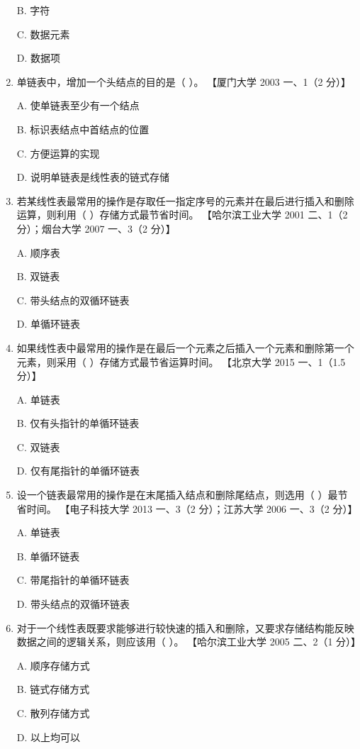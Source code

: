\documentclass[lang=cn,newtx,10pt,scheme=chinese]{elegantbook}
\begin{document}
\begin{enumerate}
    B. 字符  

    C. 数据元素  

    D. 数据项  

    \item 单链表中，增加一个头结点的目的是（ ）。  
    【厦门大学 2003 一、1（2 分）】  

    A. 使单链表至少有一个结点  

    B. 标识表结点中首结点的位置  

    C. 方便运算的实现  

    D. 说明单链表是线性表的链式存储  

    \item 若某线性表最常用的操作是存取任一指定序号的元素并在最后进行插入和删除运算，则利用（ ）存储方式最节省时间。  
    【哈尔滨工业大学 2001 二、1（2 分）；烟台大学 2007 一、3（2 分）】  

    A. 顺序表  

    B. 双链表  

    C. 带头结点的双循环链表  

    D. 单循环链表  

    \item 如果线性表中最常用的操作是在最后一个元素之后插入一个元素和删除第一个元素，则采用（ ）存储方式最节省运算时间。  
    【北京大学 2015 一、1（1.5 分）】  

    A. 单链表  

    B. 仅有头指针的单循环链表  

    C. 双链表  

    D. 仅有尾指针的单循环链表  

    \item 设一个链表最常用的操作是在末尾插入结点和删除尾结点，则选用（ ）最节省时间。  
    【电子科技大学 2013 一、3（2 分）；江苏大学 2006 一、3（2 分）】  

    A. 单链表  

    B. 单循环链表  

    C. 带尾指针的单循环链表  

    D. 带头结点的双循环链表  


    \item 对于一个线性表既要求能够进行较快速的插入和删除，又要求存储结构能反映数据之间的逻辑关系，则应该用（ ）。  
    【哈尔滨工业大学 2005 二、2（1 分）】

    A. 顺序存储方式  

    B. 链式存储方式

    C. 散列存储方式

    D. 以上均可以  


\end{enumerate}
\end{document}
